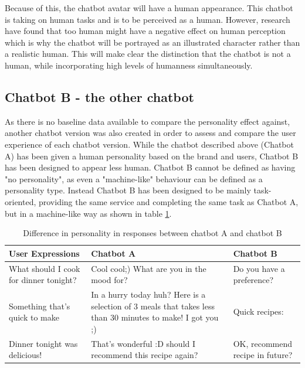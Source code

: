     Because of this, the chatbot avatar will have a human appearance. This chatbot is taking on human tasks and is to be perceived as a human. However, research have found that too human might have a negative effect on human perception which is why the chatbot will be portrayed as an illustrated character rather than a realistic human. This will make clear the distinction that the chatbot is not a human, while incorporating high levels of humanness simultaneously.
    
\vspace{5mm}

    \subsection{Chatbot B - the other chatbot}
    As there is no baseline data available to compare the personality effect against, another chatbot version was also created in order to assess and compare the user experience of each chatbot version. While the chatbot described above (Chatbot A) has been given a human personality based on the brand and users, Chatbot B has been designed to appear less human. Chatbot B cannot be defined as having "no personality", as even a "machine-like" behaviour can be defined as a personality type. Instead Chatbot B has been designed to be mainly task-oriented, providing the same service and completing the same task as Chatbot A, but in a machine-like way as shown in table \ref{table:3}.
    
    \begin{table}[h]
    \begin{tabular}{ |p{3cm}||p{5cm}||p{5cm}| }
     \hline
        User Expressions & Chatbot A & Chatbot B \\
     \hline
        What should I cook for dinner tonight? &    Cool cool;) What are you in the mood for?   & Do you have a preference? \\
     \hline   
        Something that's quick to make &   In a hurry today huh? Here is a selection of 3 meals that takes less than 30 minutes to make! I got you ;)  & Quick recipes: \\
     \hline
        Dinner tonight was delicious! & That's wonderful :D should I recommend this recipe again?  & OK, recommend recipe in future? \\
     \hline
    \end{tabular}
    \caption{Difference in personality in responses between chatbot A and chatbot B}
    \label{table:3}
    \end{table}
    
